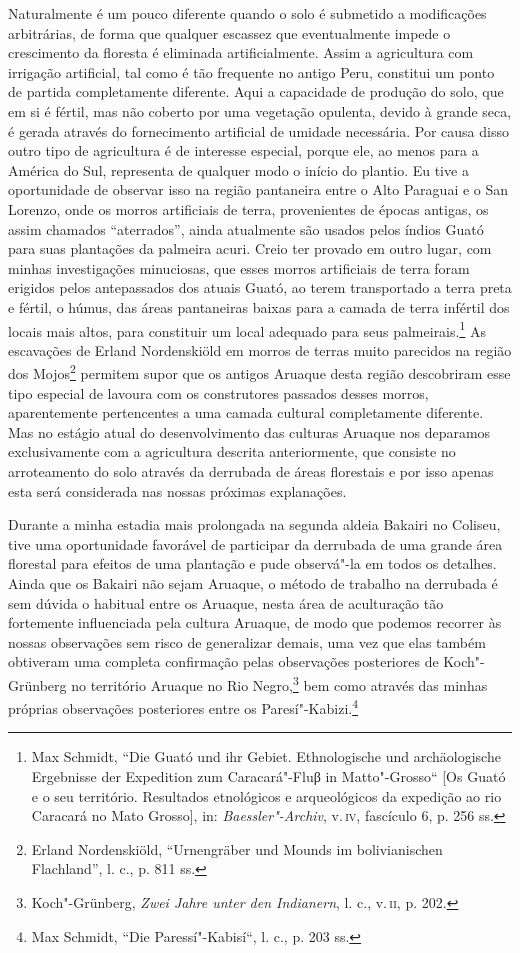 Naturalmente é um pouco diferente quando o solo é submetido a
modificações arbitrárias, de forma que qualquer escassez que
eventualmente impede o crescimento da floresta é eliminada
artificialmente. Assim a agricultura com irrigação artificial, tal como
é tão frequente no antigo Peru, constitui um ponto de partida
completamente diferente. Aqui a capacidade de produção do solo, que em
si é fértil, mas não coberto por uma vegetação opulenta, devido à grande
seca, é gerada através do fornecimento artificial de umidade necessária.
Por causa disso outro tipo de agricultura é de interesse especial,
porque ele, ao menos para a América do Sul, representa de qualquer modo
o início do plantio. Eu tive a oportunidade de observar isso na região
pantaneira entre o Alto Paraguai e o San Lorenzo, onde os morros
artificiais de terra, provenientes de épocas antigas, os assim chamados
``aterrados'', ainda atualmente são usados pelos índios Guató para suas
plantações da palmeira acuri. Creio ter provado em outro lugar, com
minhas investigações minuciosas, que esses morros artificiais de terra
foram erigidos pelos antepassados dos atuais Guató, ao terem
transportado a terra preta e fértil, o húmus, das áreas pantaneiras
baixas para a camada de terra infértil dos locais mais altos, para
constituir um local adequado para seus palmeirais.\footnote{Max Schmidt,
  ``Die Guató und ihr Gebiet. Ethnologische und archäologische
  Ergebnisse der Expedition zum Caracará"-Fluβ in Matto"-Grosso`` {[}Os
  Guató e o seu território. Resultados etnológicos e arqueológicos da
  expedição ao rio Caracará no Mato Grosso{]}, in:
  \emph{Baessler"-Archiv}, v.\,\textsc{iv}, fascículo 6, p. 256 ss.} As escavações
de Erland Nordenskiöld em morros de terras muito parecidos na região dos
Mojos\footnote{Erland Nordenskiöld, ``Urnengräber und Mounds im
  bolivianischen Flachland'', l. c., p. 811 ss.} permitem supor que os
antigos Aruaque desta região descobriram esse tipo especial de lavoura
com os construtores passados desses morros, aparentemente pertencentes
a uma camada cultural completamente diferente. Mas no estágio atual do
desenvolvimento das culturas Aruaque nos deparamos exclusivamente com a
agricultura descrita anteriormente, que consiste no arroteamento do solo
através da derrubada de áreas florestais e por isso apenas esta será
considerada nas nossas próximas explanações.

Durante a minha estadia mais prolongada na segunda aldeia Bakairi no
Coliseu, tive uma oportunidade favorável de participar da derrubada de
uma grande área florestal para efeitos de uma plantação e pude
observá"-la em todos os detalhes. Ainda que os Bakairi não sejam Aruaque,
o método de trabalho na derrubada é sem dúvida o habitual entre os
Aruaque, nesta área de aculturação tão fortemente influenciada pela
cultura Aruaque, de modo que podemos recorrer às nossas observações sem
risco de generalizar demais, uma vez que elas também obtiveram uma
completa confirmação pelas observações posteriores de Koch"-Grünberg no
território Aruaque no Rio Negro,\footnote{Koch"-Grünberg, \emph{Zwei Jahre
  unter den Indianern}, l. c., v.\,\textsc{ii}, p. 202.} bem como através das
minhas próprias observações posteriores entre os Paresí"-Kabizi.\footnote{Max
  Schmidt, ``Die Paressí"-Kabisí``, l. c., p. 203 ss.}

